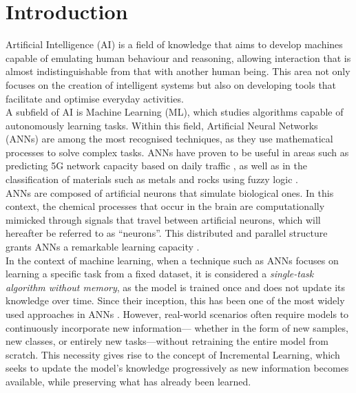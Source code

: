 \section{Introduction}

Artificial Intelligence (AI) is a field of knowledge that aims to develop machines capable of emulating human behaviour and reasoning, allowing interaction that is almost indistinguishable from that with another human being. This area not only focuses on the creation of intelligent systems but also on developing tools that facilitate and optimise everyday activities. \\

A subfield of AI is Machine Learning (ML), which studies algorithms capable of autonomously learning tasks. Within this field, Artificial Neural Networks (ANNs) are among the most recognised techniques, as they use mathematical processes to solve complex tasks. ANNs have proven to be useful in areas such as predicting 5G network capacity based on daily traffic \cite{zhao2022}, as well as in the classification of materials such as metals and rocks using fuzzy logic \cite{salazar2013}. \\

ANNs are composed of artificial neurons that simulate biological ones. In this context, the chemical processes that occur in the brain are computationally mimicked through signals that travel between artificial neurons, which will hereafter be referred to as “neurons”. This distributed and parallel structure grants ANNs a remarkable learning capacity \cite{liu2015}. \\

In the context of machine learning, when a technique such as ANNs focuses on learning a 
specific task from a fixed dataset, it is considered a \textit{single-task algorithm without 
memory}, as the model is trained once and does not update its knowledge over time. Since their 
inception, this has been one of the most widely used approaches in ANNs \cite{GiraudCarrier2000}. 
However, real-world scenarios often require models to continuously incorporate new information---
whether in the form of new samples, new classes, or entirely new tasks---without retraining the 
entire model from scratch. This necessity gives rise to the concept of Incremental Learning, 
which seeks to update the model's knowledge progressively as new information becomes available, 
while preserving what has already been learned.\\


